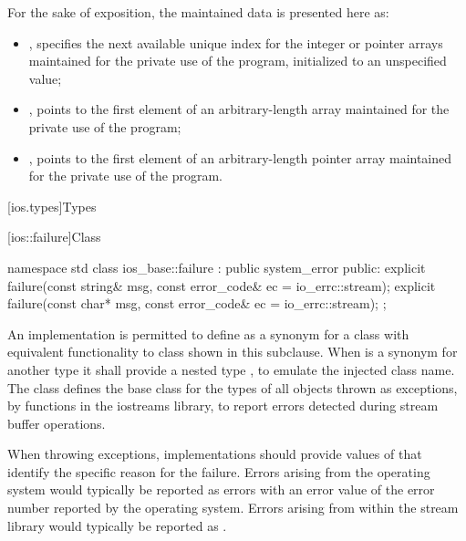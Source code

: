 \pnum
\enternote
For the sake of exposition, the maintained data is presented here as:
\begin{itemize}
\item
{},
specifies the next available
unique index for the integer or pointer arrays maintained for the private use
of the program, initialized to an unspecified value;
\item
{},
points to the first element of an
arbitrary-length
array maintained for the private use of the
program;
\item
{},
points to the first element of an
arbitrary-length pointer array maintained for the private use of the program.
\exitnote
\end{itemize}

[ios.types]{Types}

[ios::failure]{Class }

%
%
\begin{codeblock}
namespace std {
  class ios_base::failure : public system_error {
  public:
    explicit failure(const string& msg, const error_code& ec = io_errc::stream);
    explicit failure(const char* msg, const error_code& ec = io_errc::stream);
  };
}
\end{codeblock}

\pnum
An implementation is permitted to define 
as a synonym for a class with equivalent functionality
to class  shown in this subclause.
\enternote
When  is a synonym for another type
it shall provide a nested type ,
to emulate the injected class name.
\exitnote
The class
defines the base class
for the types of all objects thrown as exceptions,
by functions in the iostreams library,
to report errors detected during stream buffer operations.

\pnum
When throwing  exceptions, implementations should provide
values of  that identify the specific reason for the failure. \enternote
Errors arising from the operating system would typically be reported as
 errors with an error value of the error number
reported by the operating system. Errors arising from within the stream library would
typically be reported as . \exitnote

